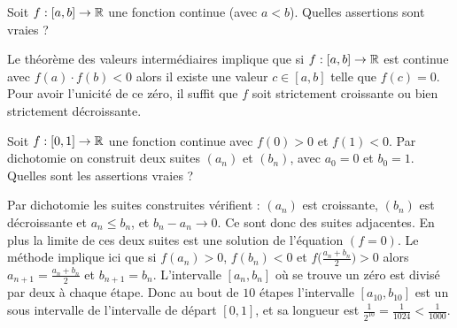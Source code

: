 \begin{question}
Soit $f : [a,b] \to \mathbb{R}$ une fonction continue (avec $a < b$). Quelles assertions sont vraies ? 
\begin{answers}



\end{answers}
\begin{explanations}
Le théorème des valeurs intermédiaires implique que si $f : [a,b] \to \mathbb{R}$ est continue avec $f(a) \cdot f(b) < 0$ alors
il existe une valeur $c \in [a,b]$ telle que $f(c)=0$. Pour avoir l'unicité de ce zéro, il suffit que $f$ soit strictement croissante ou bien strictement décroissante.
\end{explanations}
\end{question}


\begin{question}
Soit $f : [0,1] \to \mathbb{R}$ une fonction continue avec $f(0)>0$ et $f(1)<0$.
Par dichotomie on construit deux suites $(a_n)$ et $(b_n)$, avec $a_0 = 0$ et $b_0 = 1$. Quelles sont les assertions vraies ?
\begin{answers}



    
\end{answers}
\begin{explanations}
Par dichotomie les suites construites vérifient : $(a_n)$ est croissante, $(b_n)$ est décroissante et $a_n \le b_n$, et $b_n-a_n \to 0$. Ce sont donc des suites adjacentes. En plus la limite de ces deux suites est une solution de l'équation $(f=0)$.
Le méthode implique ici que si $f(a_n)>0$, $f(b_n)<0$ et $f\big(\frac{a_n+b_n}{2}\big) >0$ alors $a_{n+1} =\frac{a_n+b_n}{2}$ et $b_{n+1}=b_n$.
L'intervalle $[a_n,b_n]$ où se trouve un zéro est divisé par deux à chaque étape. Donc au bout de $10$ étapes l'intervalle
$[a_{10},b_{10}]$ est un sous intervalle de l'intervalle de départ $[0,1]$, et sa longueur est $\frac{1}{2^{10}} = \frac{1}{1024} < \frac1{1000}$.
\end{explanations}
\end{question}



